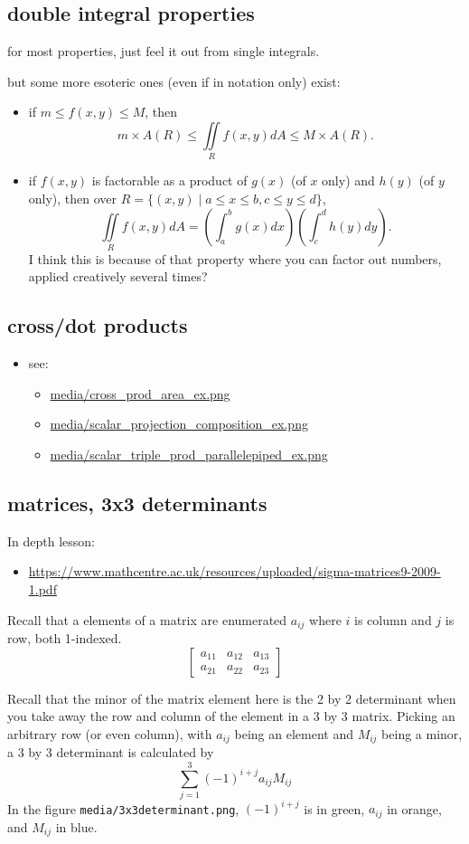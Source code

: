\documentclass[11pt]{article}
\theoremstyle{definition}
\begin{document}
\subsection*{double integral properties}
for most properties, just feel it out from single integrals.

but some more esoteric ones (even if in notation only) exist:
\begin{itemize}
  \item if $m \le f(x,y) \le M$, then
  \[ m\times A(R) \le \iint\limits_R f(x,y)dA \le M \times A(R).\]
  \item if $f(x,y)$ is factorable as a product of $g(x)$ (of $x$ only) and $h(y)$ (of $y$ only), then over $R = \{(x,y) \mid a\le x\le b, c\le y\le d\}$,
  \[\iint\limits_R f(x,y)dA  = \left(\int_{a}^{b}g(x)dx\right)\left(\int_{c}^{d}h(y)dy\right).\]
  I think this is because of that property where you can factor out numbers, applied creatively several times?
\end{itemize}

\subsection*{cross/dot products}
\begin{itemize}
  \item see:
  \begin{itemize}
    \item \url{media/cross_prod_area_ex.png}
    \item \url{media/scalar_projection_composition_ex.png}
    \item \url{media/scalar_triple_prod_parallelepiped_ex.png}
  \end{itemize}
\end{itemize}
\subsection*{matrices, 3x3 determinants}
In depth lesson:
\begin{itemize}
  \item \url{https://www.mathcentre.ac.uk/resources/uploaded/sigma-matrices9-2009-1.pdf}
\end{itemize}

Recall that a elements of a matrix are enumerated $a_{ij}$ where $i$ is column and $j$ is row, both 1-indexed. 
\[\begin{bmatrix}
  a_{11} & a_{12} & a_{13}\\
  a_{21} & a_{22} & a_{23}
\end{bmatrix}\]

Recall that the minor of the matrix element here is the 2 by 2 determinant when you take away the row and column of the element in a 3 by 3 matrix.  Picking an arbitrary row (or even column), with $a_{ij}$ being an element and $M_{ij}$ being a minor, a 3 by 3 determinant is calculated by 
\[ \sum_{j=1}^{3} (-1)^{i+j} a_{ij} M_{ij} \]
In the figure \texttt{media/3x3determinant.png}, $(-1)^{i+j}$ is in green, $a_{ij}$ in orange, and $M_{ij}$ in blue.






\end{document}
